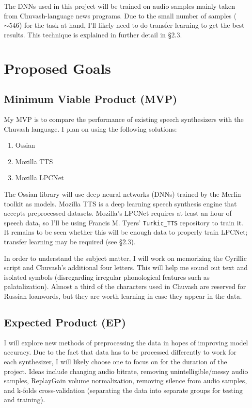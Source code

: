 \documentclass[fleqn,10pt]{SelfArx} %
\begin{document}
	The DNNs used in this project will be trained on audio samples mainly taken from Chuvash-language news programs. Due to the small number of samples ($\sim546$) for the task at hand, I'll likely need to do transfer learning to get the best results. This technique is explained in further detail in \S2.3.
	
	\section{Proposed Goals}
	\subsection{Minimum Viable Product (MVP)}
	My MVP is to compare the performance of existing speech synthesizers with the Chuvash language. I plan on using the following solutions:
	\begin{enumerate}
		\item Ossian
		\item Mozilla TTS
		\item Mozilla LPCNet
	\end{enumerate}
	
	The Ossian library will use deep neural networks (DNNs) trained by the Merlin toolkit as models. Mozilla TTS is a deep learning speech synthesis engine that accepts preprocessed datasets\cite{mozillaTTS}. Mozilla's LPCNet requires at least an hour of speech data\cite{mozillaLPC}, so I'll be using Francis M. Tyers' \texttt{Turkic\_TTS} repository to train it. It remains to be seen whether this will be enough data to properly train LPCNet; transfer learning may be required (see \S2.3).
	
	In order to understand the subject matter, I will work on memorizing the Cyrillic script and Chuvash's additional four letters. This will help me sound out text and isolated symbols (disregarding irregular phonological features such as palatalization). Almost a third of the characters used in Chuvash are reserved for Russian loanwords\cite{wikChuvash}, but they are worth learning in case they appear in the data.
	
	\subsection{Expected Product (EP)}
	I will explore new methods of preprocessing the data in hopes of improving model accuracy. Due to the fact that data has to be processed differently to work for each synthesizer, I will likely choose one to focus on for the duration of the project. Ideas include changing audio bitrate, removing unintelligible/messy audio samples, ReplayGain volume normalization, removing silence from audio samples, and k-folds cross-validation (separating the data into separate groups for testing and training).
	
\end{document}
